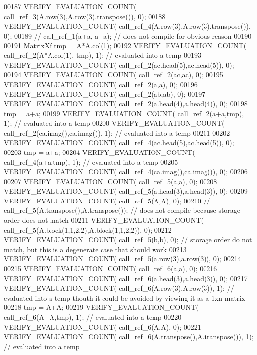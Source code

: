 \begin{DoxyCode}
00187   VERIFY\_EVALUATION\_COUNT( call\_ref\_3(A.row(3),A.row(3).transpose()), 0);
00188   VERIFY\_EVALUATION\_COUNT( call\_ref\_4(A.row(3),A.row(3).transpose()), 0);
00189 \textcolor{comment}{//   call\_ref\_1(a+a, a+a);          // does not compile for obvious reason}
00190 
00191   MatrixXf tmp = A*A.col(1);
00192   VERIFY\_EVALUATION\_COUNT( call\_ref\_2(A*A.col(1), tmp), 1);     \textcolor{comment}{// evaluated into a temp}
00193   VERIFY\_EVALUATION\_COUNT( call\_ref\_2(ac.head(5),ac.head(5)), 0);
00194   VERIFY\_EVALUATION\_COUNT( call\_ref\_2(ac,ac), 0);
00195   VERIFY\_EVALUATION\_COUNT( call\_ref\_2(a,a), 0);
00196   VERIFY\_EVALUATION\_COUNT( call\_ref\_2(ab,ab), 0);
00197   VERIFY\_EVALUATION\_COUNT( call\_ref\_2(a.head(4),a.head(4)), 0);
00198   tmp = a+a;
00199   VERIFY\_EVALUATION\_COUNT( call\_ref\_2(a+a,tmp), 1);            \textcolor{comment}{// evaluated into a temp}
00200   VERIFY\_EVALUATION\_COUNT( call\_ref\_2(ca.imag(),ca.imag()), 1);      \textcolor{comment}{// evaluated into a temp}
00201 
00202   VERIFY\_EVALUATION\_COUNT( call\_ref\_4(ac.head(5),ac.head(5)), 0);
00203   tmp = a+a;
00204   VERIFY\_EVALUATION\_COUNT( call\_ref\_4(a+a,tmp), 1);           \textcolor{comment}{// evaluated into a temp}
00205   VERIFY\_EVALUATION\_COUNT( call\_ref\_4(ca.imag(),ca.imag()), 0);
00206 
00207   VERIFY\_EVALUATION\_COUNT( call\_ref\_5(a,a), 0);
00208   VERIFY\_EVALUATION\_COUNT( call\_ref\_5(a.head(3),a.head(3)), 0);
00209   VERIFY\_EVALUATION\_COUNT( call\_ref\_5(A,A), 0);
00210 \textcolor{comment}{//   call\_ref\_5(A.transpose(),A.transpose());   // does not compile because storage order does not match}
00211   VERIFY\_EVALUATION\_COUNT( call\_ref\_5(A.block(1,1,2,2),A.block(1,1,2,2)), 0);
00212   VERIFY\_EVALUATION\_COUNT( call\_ref\_5(b,b), 0);             \textcolor{comment}{// storage order do not match, but this is a
       degenerate case that should work}
00213   VERIFY\_EVALUATION\_COUNT( call\_ref\_5(a.row(3),a.row(3)), 0);
00214 
00215   VERIFY\_EVALUATION\_COUNT( call\_ref\_6(a,a), 0);
00216   VERIFY\_EVALUATION\_COUNT( call\_ref\_6(a.head(3),a.head(3)), 0);
00217   VERIFY\_EVALUATION\_COUNT( call\_ref\_6(A.row(3),A.row(3)), 1);           \textcolor{comment}{// evaluated into a temp thouth it
       could be avoided by viewing it as a 1xn matrix}
00218   tmp = A+A;
00219   VERIFY\_EVALUATION\_COUNT( call\_ref\_6(A+A,tmp), 1);                \textcolor{comment}{// evaluated into a temp}
00220   VERIFY\_EVALUATION\_COUNT( call\_ref\_6(A,A), 0);
00221   VERIFY\_EVALUATION\_COUNT( call\_ref\_6(A.transpose(),A.transpose()), 1);      \textcolor{comment}{// evaluated into a temp
}
\end{DoxyCode}
